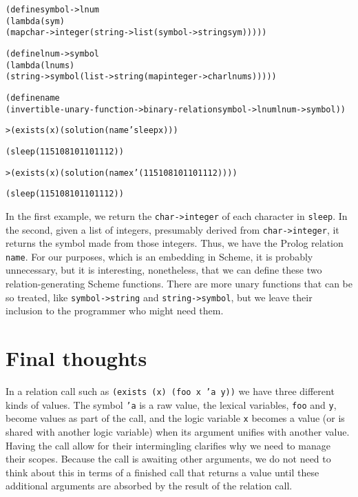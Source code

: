 \begin{alltt}
(define symbol->lnum
  (lambda (sym)
    (map char->integer (string->list (symbol->string sym)))))

(define lnum->symbol
  (lambda (lnums)
    (string->symbol (list->string (map integer->char lnums)))))

(define name
  (invertible-unary-function->binary-relation symbol->lnum lnum->symbol))
\end{alltt}
\begin{alltt}
> (exists (x) (solution (name 'sleep x)))

(sleep (115 108 101 101 112))

> (exists (x) (solution (name x '(115 108 101 101 112))))

(sleep (115 108 101 101 112))
\end{alltt}

In the first example, we return the \texttt{char->integer} of each
character in \texttt{sleep}.  In the second, given a list of integers,
presumably derived from \texttt{char->integer}, it returns the symbol
made from those integers.  Thus, we have the Prolog relation
\texttt{name}.  For our purposes, which is an embedding in Scheme, it
is probably unnecessary, but it is interesting, nonetheless, that we
can define these two relation-generating Scheme functions.  There are
more unary functions that can be so treated, like
\texttt{symbol->string} and \texttt{string->symbol}, but we leave
their inclusion to the programmer who might need them.

\section{Final thoughts}

In a relation call such as \texttt{(exists (x) (foo x 'a y))} we have
three different kinds of values.  The symbol \texttt{'a} is a raw
value, the lexical variables, \texttt{foo} and \texttt{y}, become
values as part of the call, and the logic variable \texttt{x} becomes
a value (or is shared with another logic variable) when its argument
unifies with another value.  Having the call allow for their
intermingling clarifies why we need to manage their scopes.  Because
the call is awaiting other arguments, we do not need to think about
this in terms of a finished call that returns a value until these
additional arguments are absorbed by the result of the relation call.

